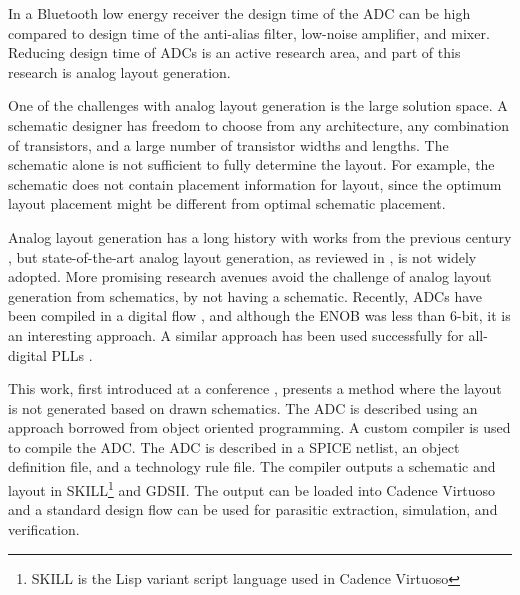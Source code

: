 In a
Bluetooth\textsuperscript{\textregistered} low energy receiver the
design time of the ADC can be high compared to design time of the anti-alias filter,
low-noise amplifier, and mixer.
Reducing design time of ADCs is an active research area, and part of
this research is analog layout generation.

One of the challenges with analog layout generation is the large
solution space. A schematic designer has freedom
to choose from any architecture, any combination of transistors, and a
large number of transistor widths and lengths. The schematic
alone is not sufficient to fully determine the layout. For example, the
schematic does not contain placement information for layout, since the
optimum layout placement might be different from optimal schematic
placement.

Analog layout generation has a long history with works from the
previous century \cite{rijmenants89,bruce96}, but state-of-the-art
analog layout generation, as reviewed in \cite{martin13}, is not
widely adopted. More promising research avenues avoid the challenge of analog layout
generation from schematics, by not having a schematic.  Recently, ADCs have been compiled in a digital flow
\cite{weaver14,fahmy15}, and although the ENOB was less than 6-bit, it is an interesting approach. A similar
approach has been used successfully for all-digital PLLs \cite{deng15}.

This work, first introduced at a conference \cite{wulff16}, presents a
method where the layout is not
generated based on drawn schematics. The ADC is described
using an approach borrowed from object oriented
programming.
A custom compiler is used to compile the ADC. The ADC is described in
a SPICE netlist, an
object definition file, and a technology rule file. The compiler outputs
a schematic and layout in SKILL\footnote{SKILL is the Lisp variant
  script language used in Cadence Virtuoso} and GDSII.
The output can be loaded into
Cadence Virtuoso and a standard design flow can be used for
parasitic extraction, simulation, and verification.

